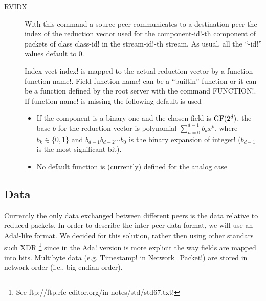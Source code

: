 \documentclass{medusabook}
\begin{document}
\begin{description}
  \item[RVIDX]  With this command a source peer communicates to a
  destination peer the index of the reduction vector used for the \ttt
  component-id!-th component of packets of class \ttt class-id! in the
  \ttt stream-id!-th stream.  As usual, all the ``\ttt-id!'' values
  default to 0.

  Index \ttt vect-index! is mapped to the actual reduction vector by a
  function \ttt function-name!. Field \ttt function-name! can be a
  ``builtin'' function or it can be a function defined by the root
  server with the command \ttt FUNCTION!. If \ttt function-name! is
  missing the following default is used
  \begin{itemize}
  \item
  If the component is a binary one and the chosen field is $\operatorname{GF}(2^d)$,
  the base $b$ for the reduction vector is polynomial
  $\sum_{n=0}^{d-1} b_k x^k$, where $b_k \in \{0,1\}$ and $b_{d-1}
  b_{d-2} \cdots b_0$ is the binary expansion of \ttt integer!
  ($b_{d-1}$ is the most significant bit).  
  \item No default function is (currently) defined for the analog case
  \end{itemize}
\end{description}

\subsection{Data}
\label{sub:1.4.2;medusa_book}

Currently the only data exchanged between different peers is the data
relative to reduced packets.  In order to describe the inter-peer data
format, we will use an \ttt Ada!-like format.  We decided for this
solution, rather then using other standars such XDR
\cite{rfc4506}\footnote{See \ttt
  ftp://ftp.rfc-editor.org/in-notes/std/std67.txt!} since in the \ttt
Ada! version is more explicit the way fields are mapped into bits.
Multibyte data (e.g. \ttt Timestamp! in \ttt Network_Packet!) are
stored in network order (i.e., big endian order).

\end{document}
